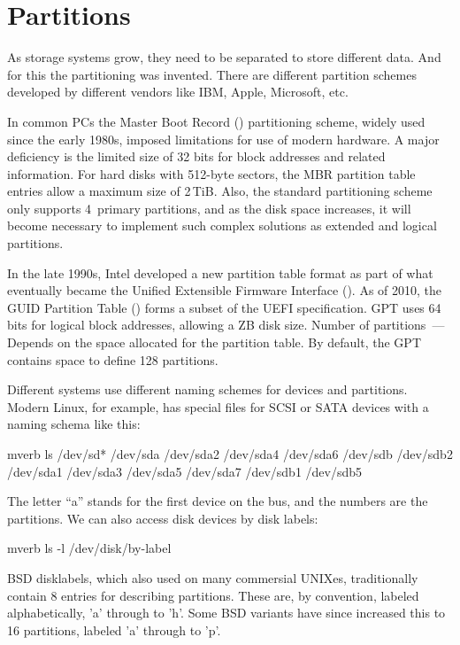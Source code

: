 \section*{Partitions} %

As storage systems grow, they need to be separated to store different data.
And for this the partitioning was invented. There are different partition
schemes developed by different vendors like IBM, Apple, Microsoft, etc.

In common PCs the Master Boot Record () partitioning scheme, widely
used since the early 1980s, imposed limitations for use of modern hardware.
A major deficiency is the limited size of 32 bits for block addresses and
related information. For hard disks with 512-byte sectors, the MBR partition
table entries allow a maximum size of 2\,TiB. Also, the standard partitioning
scheme only supports 4~primary partitions, and as the disk space increases,
it will become necessary to implement such complex solutions as extended and
logical partitions.

In the late 1990s, Intel developed a new partition table format as part of
what eventually became the Unified Extensible Firmware Interface ().
As of 2010, the GUID Partition Table () forms a subset of
the UEFI specification. GPT uses 64 bits for logical block addresses,
allowing a ZB disk size. Number of partitions~--- Depends on the space
allocated for the partition table. By default, the GPT contains space
to define 128 partitions.

Different systems use different naming schemes for devices and partitions.
Modern Linux, for example, has special  files for SCSI or
SATA devices with a naming schema like this:
\begin{code}{mverb}
ls /dev/sd*
/dev/sda   /dev/sda2  /dev/sda4  /dev/sda6  /dev/sdb   /dev/sdb2
/dev/sda1  /dev/sda3  /dev/sda5  /dev/sda7  /dev/sdb1  /dev/sdb5
\end{code}
The letter ``a'' stands for the first device on the bus, and the numbers
are the partitions. We can also access disk devices by disk labels:
\begin{code}{mverb}
ls -l /dev/disk/by-label
\end{code}

BSD disklabels, which also used on many commersial UNIXes, traditionally
contain 8 entries for describing partitions. These are, by convention,
labeled alphabetically, 'a' through to 'h'. Some BSD variants have since
increased this to 16 partitions, labeled 'a' through to 'p'.

